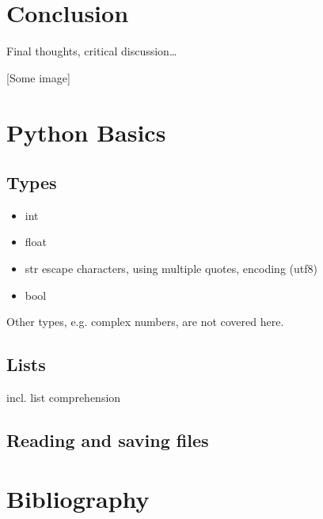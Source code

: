 \documentclass[letterpaper,10pt,english]{sphinxmanual}
\begin{document}
\chapter{Conclusion}
\label{\detokenize{conclusion:conclusion}}\label{\detokenize{conclusion::doc}}
Final thoughts, critical discussion…

{[}Some image{]}


\chapter{Python Basics}
\label{\detokenize{python_basics:python-basics}}\label{\detokenize{python_basics::doc}}

\section{Types}
\label{\detokenize{python_basics:types}}\begin{itemize}
\item {} 
int

\item {} 
float

\item {} 
str
\sphinxhyphen{} escape characters, using multiple quotes, encoding (utf\sphinxhyphen{}8)

\item {} 
bool

\end{itemize}

Other types, e.g. complex numbers, are not covered here.


\section{Lists}
\label{\detokenize{python_basics:lists}}
incl. list comprehension


\section{Reading and saving files}
\label{\detokenize{python_basics:reading-and-saving-files}}

\chapter{Bibliography}
\label{\detokenize{bibliography:bibliography}}\label{\detokenize{bibliography::doc}}
\end{document}
